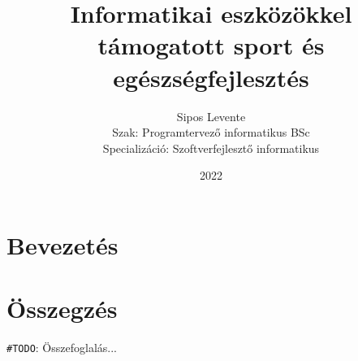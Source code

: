 \documentclass[tocnopagenum]{thesis-ekf}
\newtheorem{tetel}{Tétel}[chapter]
\theoremstyle{definition}
\newtheorem{definicio}[tetel]{Definíció}
\theoremstyle{remark}
\newtheorem{megjegyzes}[tetel]{Megjegyzés}
\begin{document}
	\title{Informatikai eszközökkel támogatott sport és egészségfejlesztés}
	\author{Sipos Levente\\Szak: Programtervező informatikus BSc\\Specializáció: Szoftverfejlesztő informatikus}
	\date{2022}
	\maketitle
	\tableofcontents

	\chapter*{Bevezetés}
	\begin{comment}
		Ezek később lesznek hasznosak
		\begin{tetel}
			Tétel szövege.
		\end{tetel}
		
		\begin{proof}
			Bizonyítás szövege.
		\end{proof}
		
		\begin{definicio}
			Definíció szövege.
		\end{definicio}
		
		\begin{megjegyzes}
			Megjegyzés szövege.
		\end{megjegyzes}
	\end{comment}
	\chapter*{Összegzés}


	
	\verb*|#TODO|: Összefoglalás...
	
	
	
\end{document}
